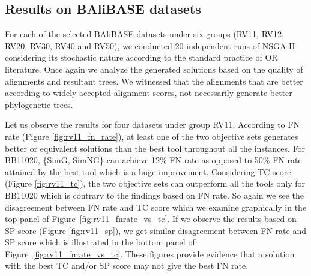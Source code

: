 \subsection{Results on BAliBASE datasets}
For each of the selected BAliBASE datasets under six groups (RV11, RV12, RV20, RV30, RV40 and RV50), we conducted 20 independent runs of NSGA-II considering its stochastic nature according to the standard practice of OR literature. Once again we analyze the generated solutions based on the quality of alignments and resultant trees. We witnessed that the alignments that are better according to widely accepted alignment scores, not necessarily generate better phylogenetic trees.

Let us observe the results for four datasets under group RV11. According to FN rate (Figure \ref{fig:rv11_fn_rate}), at least one of the two objective sets generates better or equivalent solutions than the best tool throughout all the instances. For BB11020, \{SimG, SimNG\} can achieve 12\% FN rate as opposed to 50\% FN rate attained by the best tool which is a huge improvement. Considering TC score (Figure \ref{fig:rv11_tc}), the two objective sets can outperform all the tools only for BB11020 which is contrary to the findings based on FN rate. So again we see the disagreement between FN rate and TC score which we examine graphically in the top panel of Figure~\ref{fig:rv11_fnrate_vs_tc}. If we observe the results based on SP score (Figure \ref{fig:rv11_sp}), we get similar disagreement between FN rate and SP score which is illustrated in the bottom panel of Figure~\ref{fig:rv11_fnrate_vs_tc}. These figures provide evidence that a solution with the best TC and/or SP score may not give the best FN rate.

